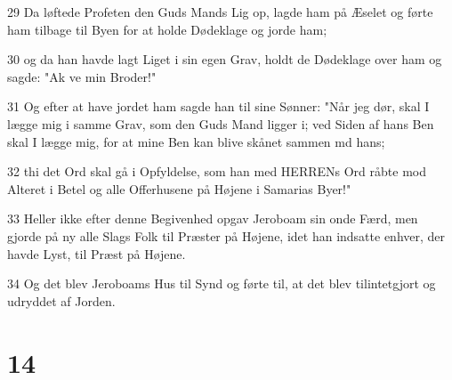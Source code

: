 \par 29 Da løftede Profeten den Guds Mands Lig op, lagde ham på Æselet og førte ham tilbage til Byen for at holde Dødeklage og jorde ham;
\par 30 og da han havde lagt Liget i sin egen Grav, holdt de Dødeklage over ham og sagde: "Ak ve min Broder!"
\par 31 Og efter at have jordet ham sagde han til sine Sønner: "Når jeg dør, skal I lægge mig i samme Grav, som den Guds Mand ligger i; ved Siden af hans Ben skal I lægge mig, for at mine Ben kan blive skånet sammen md hans;
\par 32 thi det Ord skal gå i Opfyldelse, som han med HERRENs Ord råbte mod Alteret i Betel og alle Offerhusene på Højene i Samarias Byer!"
\par 33 Heller ikke efter denne Begivenhed opgav Jeroboam sin onde Færd, men gjorde på ny alle Slags Folk til Præster på Højene, idet han indsatte enhver, der havde Lyst, til Præst på Højene.
\par 34 Og det blev Jeroboams Hus til Synd og førte til, at det blev tilintetgjort og udryddet af Jorden.

\chapter{14}

